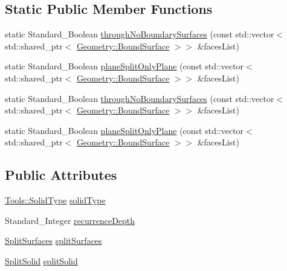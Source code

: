 \subsection*{Static Public Member Functions}
\begin{DoxyCompactItemize}
\item 
static Standard\+\_\+\+Boolean \hyperlink{classMcCAD_1_1Decomposition_1_1DecomposeSolid_1_1Impl_aade70e5860e8ee29ff8f9e4c4cfc53b9}{through\+No\+Boundary\+Surfaces} (const std\+::vector$<$ std\+::shared\+\_\+ptr$<$ \hyperlink{classMcCAD_1_1Geometry_1_1BoundSurface}{Geometry\+::\+Bound\+Surface} $>$$>$ \&faces\+List)
\item 
static Standard\+\_\+\+Boolean \hyperlink{classMcCAD_1_1Decomposition_1_1DecomposeSolid_1_1Impl_a2000d66a4d389e32550b981c5b82ba8a}{plane\+Split\+Only\+Plane} (const std\+::vector$<$ std\+::shared\+\_\+ptr$<$ \hyperlink{classMcCAD_1_1Geometry_1_1BoundSurface}{Geometry\+::\+Bound\+Surface} $>$$>$ \&faces\+List)
\item 
static Standard\+\_\+\+Boolean \hyperlink{classMcCAD_1_1Decomposition_1_1DecomposeSolid_1_1Impl_a4461102b73f4631589d762bae498688f}{through\+No\+Boundary\+Surfaces} (const std\+::vector$<$ std\+::shared\+\_\+ptr$<$ \hyperlink{classMcCAD_1_1Geometry_1_1BoundSurface}{Geometry\+::\+Bound\+Surface} $>$$>$ \&faces\+List)
\item 
static Standard\+\_\+\+Boolean \hyperlink{classMcCAD_1_1Decomposition_1_1DecomposeSolid_1_1Impl_a2000110584c9386b79ba32ffc67cfa89}{plane\+Split\+Only\+Plane} (const std\+::vector$<$ std\+::shared\+\_\+ptr$<$ \hyperlink{classMcCAD_1_1Geometry_1_1BoundSurface}{Geometry\+::\+Bound\+Surface} $>$$>$ \&faces\+List)
\end{DoxyCompactItemize}
\subsection*{Public Attributes}
\begin{DoxyCompactItemize}
\item 
\hyperlink{classMcCAD_1_1Tools_1_1SolidType}{Tools\+::\+Solid\+Type} \hyperlink{classMcCAD_1_1Decomposition_1_1DecomposeSolid_1_1Impl_ad808642e410eb4b8fa0d42b9a8ca3715}{solid\+Type}
\item 
Standard\+\_\+\+Integer \hyperlink{classMcCAD_1_1Decomposition_1_1DecomposeSolid_1_1Impl_ad908b2687b52f636d8368b814aa5f770}{recurrence\+Depth}
\item 
\hyperlink{classMcCAD_1_1Decomposition_1_1SplitSurfaces}{Split\+Surfaces} \hyperlink{classMcCAD_1_1Decomposition_1_1DecomposeSolid_1_1Impl_a5e72556bef4688c0c2c9de93cfcd8f55}{split\+Surfaces}
\item 
\hyperlink{classMcCAD_1_1Decomposition_1_1SplitSolid}{Split\+Solid} \hyperlink{classMcCAD_1_1Decomposition_1_1DecomposeSolid_1_1Impl_a8f68c947c10927a2a6ae1f5f864bd74f}{split\+Solid}
\end{DoxyCompactItemize}


